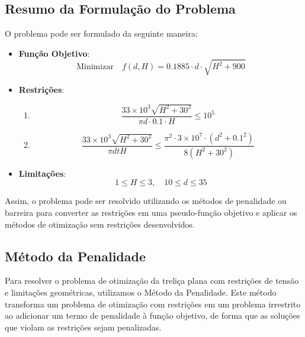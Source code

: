\documentclass[a4paper, 12pt]{article}
\begin{document}
\subsection{Resumo da Formulação do Problema}

O problema pode ser formulado da seguinte maneira:

\begin{itemize}
    \item \textbf{Função Objetivo}:
    \begin{equation}
        \text{Minimizar} \quad f(d, H) = 0.1885 \cdot d \cdot \sqrt{H^2 + 900}
    \end{equation}

    \item \textbf{Restrições}:
    \begin{enumerate}
        \item \begin{equation}
                \frac{33 \times 10^3 \sqrt{H^2 + 30^2}}{\pi d \cdot 0.1 \cdot H} \leq 10^5
              \end{equation}

        \item \begin{equation}
                \frac{33 \times 10^3 \sqrt{H^2 + 30^2}}{\pi d t H} \leq \frac{\pi^2 \cdot 3 \times 10^7 \cdot (d^2 + 0.1^2)}{8 (H^2 + 30^2)}
              \end{equation}
    \end{enumerate}

    \item \textbf{Limitações}:
    \begin{equation}
        1 \leq H \leq 3, \quad 10 \leq d \leq 35
    \end{equation}
\end{itemize}

Assim, o problema pode ser resolvido utilizando os métodos de penalidade ou barreira para converter as restrições em uma pseudo-função objetivo e aplicar os métodos de otimização sem restrições desenvolvidos.


\subsection{Método da Penalidade}

Para resolver o problema de otimização da treliça plana com restrições de tensão e limitações geométricas, utilizamos o Método da Penalidade. Este método transforma um problema de otimização com restrições em um problema irrestrito ao adicionar um termo de penalidade à função objetivo, de forma que as soluções que violam as restrições sejam penalizadas.\\
\end{document}
